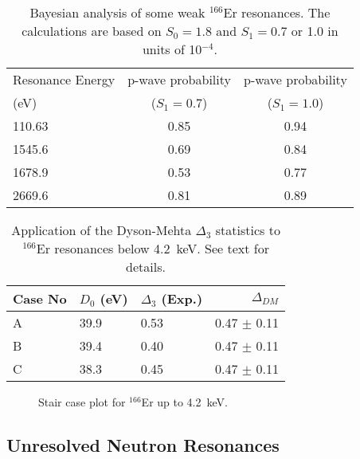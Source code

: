 \documentclass[twocolumn,amsmath,amssymb,10pt,groupedaddress,a4paper]{revtex4}
\begin{document}
\begin{table}[htbp]
\caption{Bayesian analysis of some weak $^{166}$Er  resonances. The calculations
are based on $S_0=1.8$ and $S_1=0.7$ or 1.0 in units of 10$^{-4}$. }
\label{bayesian1}
\begin{center}
\begin{tabular}{lcc}
\hline
Resonance Energy &  p-wave probability&     p-wave probability\\
(eV)             &     ($S_1=0.7$)    &           ($S_1=1.0$)\\
\hline
110.63           &     0.85           &      0.94\\
1545.6           &     0.69           &      0.84\\
1678.9           &     0.53           &      0.77\\
2669.6           &     0.81           &      0.89\\
\hline
\end{tabular}
\end{center}
\end{table}

\begin{table}[htbp]
\caption{Application of the Dyson-Mehta $\Delta_3$ statistics  to $^{166}$Er resonances
   below  4.2~keV. See text for details. }
\label{bayesian2}
\begin{center}
\begin{tabular}{lllr}
\hline
Case No  & $D_0$ (eV)&      $\Delta_3$ (Exp.) &     $\Delta_{DM}$\\
\hline
A     &    39.9   &   0.53   &      0.47 $\pm$ 0.11\\
B      &   39.4   &   0.40   &      0.47  $\pm$ 0.11\\
C       &  38.3   &   0.45   &      0.47  $\pm$ 0.11\\
\hline
\end{tabular}
\end{center}
\end{table}

\begin{figure}[htbp]
\caption{Stair case plot for $^{166}$Er up to 4.2~keV.}
\label{er166}
\end{figure}

\subsection{Unresolved Neutron Resonances}
\end{document}
